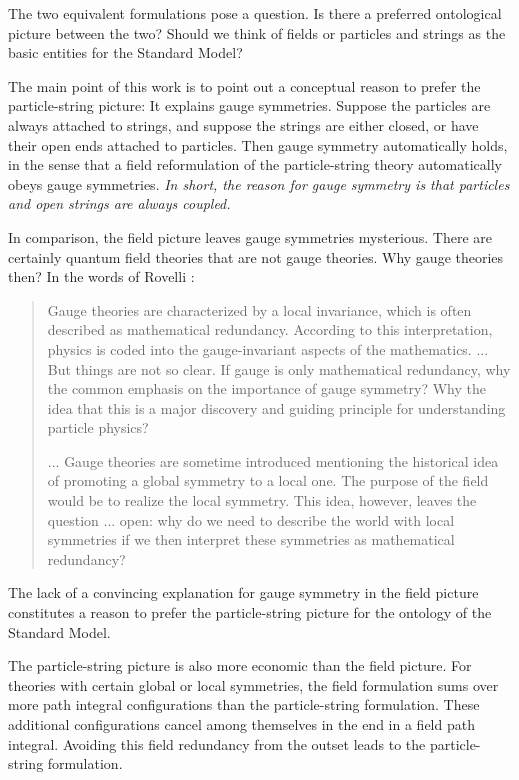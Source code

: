 \documentclass[12pt]{article}
\theoremstyle{definition}
\begin{document}
The two equivalent formulations pose a question. Is there a preferred ontological picture between the two? Should we think of fields or particles and strings as the basic entities for the Standard Model?


The main point of this work is to point out a conceptual reason to prefer the particle-string picture: It explains gauge symmetries. Suppose the particles are always attached to strings, and suppose the strings are either closed, or have their open ends attached to particles. Then gauge symmetry automatically holds, in the sense that a field reformulation of the particle-string theory automatically obeys gauge symmetries. \textit{In short, the reason for gauge symmetry is that particles and open strings are always coupled.}

In comparison, the field picture leaves gauge symmetries mysterious. There are certainly quantum field theories that are not gauge theories. Why gauge theories then? In the words of Rovelli \cite{Rovelli2014WhyGauge}:
\begin{quote}
Gauge theories are characterized by a local invariance, which is often described as mathematical redundancy. According to this interpretation, physics is coded into the gauge-invariant aspects of the mathematics. ... But things are not so clear. If gauge is only mathematical redundancy, why the common emphasis on the importance of gauge symmetry? Why the idea that this is a major discovery and guiding principle for understanding particle physics?

... Gauge theories are sometime introduced mentioning the historical idea of promoting a global symmetry to a local one. The purpose of the field would be to realize the local symmetry. This idea, however, leaves the question ... open: why do we need to describe the world with local symmetries if we then interpret these symmetries as mathematical redundancy?
\end{quote}
The lack of a convincing explanation for gauge symmetry in the field picture constitutes a reason to prefer the particle-string picture for the ontology of the Standard Model.

The particle-string picture is also more economic than the field picture. For theories with certain global or local symmetries, the field formulation sums over more path integral configurations than the particle-string formulation. These additional configurations cancel among themselves in the end in a field path integral. Avoiding this field redundancy from the outset leads to the particle-string formulation.
\end{document}
